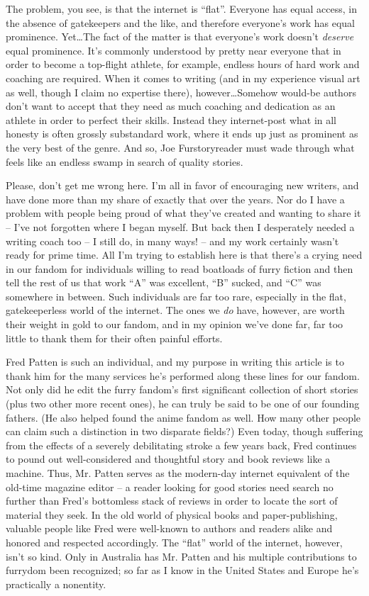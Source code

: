 The problem, you see, is that the internet is ``flat''. Everyone has equal access, in the absence of gatekeepers and the like, and therefore everyone's work has equal prominence. Yet\ldots  The fact of the matter is that everyone's work doesn't \textit{deserve} equal prominence. It's commonly understood by pretty near everyone that in order to become a top-flight athlete, for example, endless hours of hard work and coaching are required. When it comes to writing (and in my experience visual art as well, though I claim no expertise there), however\ldots  Somehow would-be authors don't want to accept that they need as much coaching and dedication as an athlete in order to perfect their skills. Instead they internet-post what in all honesty is often grossly substandard work, where it ends up just as prominent as the very best of the genre. And so, Joe Furstoryreader must wade through what feels like an endless swamp in search of quality stories.

Please, don't get me wrong here. I'm all in favor of encouraging new writers, and have done more than my share of exactly that over the years. Nor do I have a problem with people being proud of what they've created and wanting to share it -- I've not forgotten where I began myself. But back then I desperately needed a writing coach too -- I still do, in many ways! -- and my work certainly wasn't ready for prime time. All I'm trying to establish here is that there's a crying need in our fandom for individuals willing to read boatloads of furry fiction and then tell the rest of us that work ``A'' was excellent, ``B'' sucked, and ``C'' was somewhere in between. Such individuals are far too rare, especially in the flat, gatekeeperless world of the internet. The ones we \textit{do} have, however, are worth their weight in gold to our fandom, and in my opinion we've done far, far too little to thank them for their often painful efforts.

Fred Patten is such an individual, and my purpose in writing this article is to thank him for the many services he's performed along these lines for our fandom. Not only did he edit the furry fandom's first significant collection of short stories (plus two other more recent ones), he can truly be said to be one of our founding fathers. (He also helped found the anime fandom as well. How many other people can claim such a distinction in two disparate fields?) Even today, though suffering from the effects of a severely debilitating stroke a few years back, Fred continues to pound out well-considered and thoughtful story and book reviews like a machine. Thus, Mr. Patten serves as the modern-day internet equivalent of the old-time magazine editor -- a reader looking for good stories need search no further than Fred's bottomless stack of reviews in order to locate the sort of material they seek. In the old world of physical books and paper-publishing, valuable people like Fred were well-known to authors and readers alike and honored and respected accordingly. The ``flat'' world of the internet, however, isn't so kind. Only in Australia has Mr. Patten and his multiple contributions to furrydom been recognized; so far as I know in the United States and Europe he's practically a nonentity.

